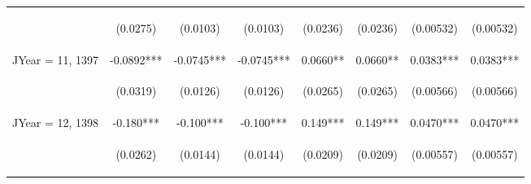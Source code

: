 \documentclass[]{article}
\begin{document}
\begin{center}
\begin{tabular}{lccccccc}
\vspace{4pt} & \begin{footnotesize}(0.0275)\end{footnotesize} & \begin{footnotesize}(0.0103)\end{footnotesize} & \begin{footnotesize}(0.0103)\end{footnotesize} & \begin{footnotesize}(0.0236)\end{footnotesize} & \begin{footnotesize}(0.0236)\end{footnotesize} & \begin{footnotesize}(0.00532)\end{footnotesize} & \begin{footnotesize}(0.00532)\end{footnotesize} \\
JYear = 11, 1397 & -0.0892*** & -0.0745*** & -0.0745*** & 0.0660** & 0.0660** & 0.0383*** & 0.0383*** \\
\vspace{4pt} & \begin{footnotesize}(0.0319)\end{footnotesize} & \begin{footnotesize}(0.0126)\end{footnotesize} & \begin{footnotesize}(0.0126)\end{footnotesize} & \begin{footnotesize}(0.0265)\end{footnotesize} & \begin{footnotesize}(0.0265)\end{footnotesize} & \begin{footnotesize}(0.00566)\end{footnotesize} & \begin{footnotesize}(0.00566)\end{footnotesize} \\
JYear = 12, 1398 & -0.180*** & -0.100*** & -0.100*** & 0.149*** & 0.149*** & 0.0470*** & 0.0470*** \\
\vspace{4pt} & \begin{footnotesize}(0.0262)\end{footnotesize} & \begin{footnotesize}(0.0144)\end{footnotesize} & \begin{footnotesize}(0.0144)\end{footnotesize} & \begin{footnotesize}(0.0209)\end{footnotesize} & \begin{footnotesize}(0.0209)\end{footnotesize} & \begin{footnotesize}(0.00557)\end{footnotesize} & \begin{footnotesize}(0.00557)\end{footnotesize} \\

\end{tabular}
\end{center}
\end{document}
